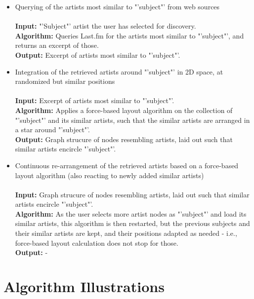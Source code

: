 \begin{itemize}
	\item Querying of the artists most similar to "'subject"' from web sources \\\\
				\textbf{Input:} "'Subject"' artist the user has selected for discovery. \\
				\textbf{Algorithm:} Queries Last.fm for the artists most similar to "'subject"', and returns
				an excerpt of those. \\
				\textbf{Output:} Excerpt of artists most similar to "'subject"'. \\
	\item Integration of the retrieved artists around "'subject"' in 2D space, at randomized but similar positions \\\\
				\textbf{Input:} Excerpt of artists most similar to "'subject"'. \\
				\textbf{Algorithm:} Applies a force-based layout algorithm on the collection of "'subject"' and
				its similar artists, such that the similar artists are arranged in a star around "'subject"'. \\
				\textbf{Output:} Graph strucure of nodes resembling artists, laid out such that similar
				artists encircle "'subject"'. \\
	\item Continuous re-arrangement of the retrieved artists based on a force-based layout algorithm (also reacting to newly added similar artists) \\\\
				\textbf{Input:} Graph strucure of nodes resembling artists, laid out such that similar
				artists encircle "'subject"'. \\
				\textbf{Algorithm:} As the user selects more artist nodes as "'subject"' and load
				its similar artists, this algorithm is then restarted, but the previous subjects and their
				similar artists are kept, and their positions adapted as needed - i.e., force-based layout
				calculation does not stop for those. \\
				\textbf{Output:} - \\
\end{itemize}

\section{Algorithm Illustrations}


